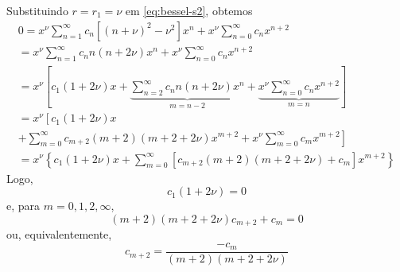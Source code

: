 Substituindo $r=r_1=\nu$ em \eqref{eq:bessel-s2}, obtemos
\begin{gather}
  0 = x^\nu\sum_{n=1}^\infty c_n\left[(n+\nu)^2-\nu^2\right]x^n + x^\nu\sum_{n=0}^\infty c_nx^{n+2}\\
  =  x^\nu\sum_{n=1}^\infty c_nn(n+2\nu)x^n + x^\nu\sum_{n=0}^\infty c_nx^{n+2}\\
  = x^\nu\left[c_1(1+2\nu)x + \underbrace{\sum_{n=2}^\infty c_nn(n+2\nu)x^n}_{m=n-2} + \underbrace{x^\nu\sum_{n=0}^\infty c_nx^{n+2}}_{m=n}\right]\\
  = x^\nu\left[c_1(1+2\nu)x \right.\\
  \left. + \sum_{m=0}^\infty c_{m+2}(m+2)(m+2+2\nu)x^{m+2} + x^\nu\sum_{m=0}^\infty c_mx^{m+2}\right]\\
  = x^\nu\left\{c_1(1+2\nu)x + \sum_{m=0}^\infty \left[c_{m+2}(m+2)(m+2+2\nu) + c_m\right]x^{m+2}\right\}
\end{gather}
Logo,
\begin{equation}
  c_1(1+2\nu) = 0
\end{equation}
e, para $m=0,1,2,\infty$,
\begin{equation}
  (m+2)(m+2+2\nu)c_{m+2}+c_m = 0
\end{equation}
ou, equivalentemente,
\begin{equation}
  c_{m+2} = \frac{-c_m}{(m+2)(m+2+2\nu)}
\end{equation}

